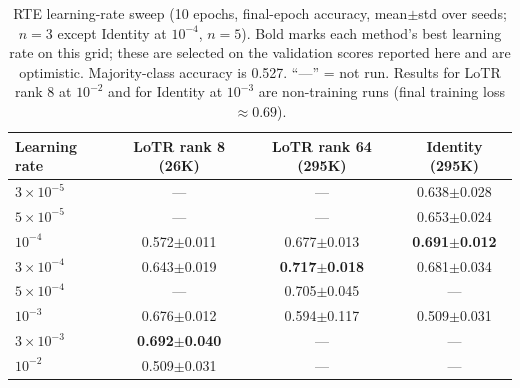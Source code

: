 \documentclass{article}
\theoremstyle{plain}
\begin{document}
\begin{table}[h]
\centering
\caption{RTE learning-rate sweep (10 epochs, final-epoch accuracy, mean$\pm$std over seeds; $n=3$ except Identity at $10^{-4}$, $n=5$).
Bold marks each method's best learning rate on this grid; these are selected on the validation scores reported here and are optimistic.
Majority-class accuracy is 0.527. ``---'' = not run. Results for LoTR rank 8 at $10^{-2}$ and for Identity at $10^{-3}$ are non-training runs
(final training loss $\approx0.69$).}
\label{tab:rte_lr}
\small
\begin{tabular}{lccc}
\toprule
Learning rate & LoTR rank 8 (26K) & LoTR rank 64 (295K) & Identity (295K) \\
\midrule
$3\times10^{-5}$ & --- & --- & 0.638$\pm$0.028 \\
$5\times10^{-5}$ & --- & --- & 0.653$\pm$0.024 \\
$10^{-4}$        & 0.572$\pm$0.011 & 0.677$\pm$0.013 & \textbf{0.691$\pm$0.012} \\
$3\times10^{-4}$ & 0.643$\pm$0.019 & \textbf{0.717$\pm$0.018} & 0.681$\pm$0.034 \\
$5\times10^{-4}$ & --- & 0.705$\pm$0.045 & --- \\
$10^{-3}$        & 0.676$\pm$0.012 & 0.594$\pm$0.117 & 0.509$\pm$0.031 \\
$3\times10^{-3}$ & \textbf{0.692$\pm$0.040} & --- & --- \\
$10^{-2}$        & 0.509$\pm$0.031 & --- & --- \\
\bottomrule
\end{tabular}
\end{table}
\end{document}
